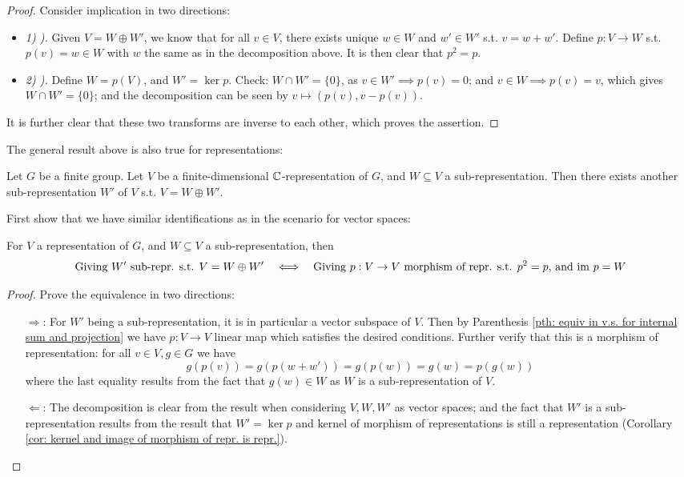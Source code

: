 \documentclass{article}
\begin{document}
\begin{proof}
    Consider implication in two directions:
    \begin{itemize}
        \item \emph{1) ).} Given $V = W \oplus W'$, we know that for all $v \in V$, there exists unique $w \in W$ and $w' \in W'$ s.t. $v = w + w'$. Define $p: V \to W$ s.t. $p(v) = w \in W$ with $w$ the same as in the decomposition above. It is then clear that $p^2 = p$.
        \item \emph{2) ).} Define $W = p(V)$, and $W' = \ker p$. Check: $W \cap W' = \{0\}$, as $v \in W' \implies p(v) = 0$; and $v \in W \implies p(v) = v$, which gives $W \cap W' = \{0\}$; and the decomposition can be seen by $v \mapsto (p(v), v - p(v))$.
    \end{itemize}
    It is further clear that these two transforms are inverse to each other, which proves the assertion.
\end{proof}

\textstart
The general result above is also true for representations:
\begin{theorem}\label{thm: decomposition of repr.}
    Let $G$ be a finite group. Let $V$ be a finite-dimensional $\mathbb{C}$-representation of $G$, and $W \subseteq V$ a sub-representation. Then there exists another sub-representation $W'$ of $V$ s.t. $V = W \oplus W'$.
\end{theorem}

First show that we have similar identifications as in the scenario for vector spaces: 
\begin{proposition}
    For $V$ a representation of $G$, and $W \subseteq V$ a sub-representation, then
    \[
        \text{Giving $W'$ sub-repr. s.t. $V = W \oplus W'$} \quad \Longleftrightarrow \quad \text{Giving $p: V \to V$ morphism of repr. s.t. $p^2 = p$, and $\mathrm{im}\  p = W$}
    \]
\end{proposition}
\begin{proof}
    Prove the equivalence in two directions:
    \begin{itemize}
        \item[$\Rightarrow$:] For $W'$ being a sub-representation, it is in particular a vector subspace of $V$. Then by Parenthesis \ref{pth: equiv in v.s. for internal sum and projection} we have $p: V \to V$ linear map which satisfies the desired conditions. Further verify that this is a morphism of representation: for all $v \in V, g \in G$ we have
        \[
            g(p(v)) = g(p(w + w')) = g(p(w)) = g(w) = p(g(w))
            \]
            where the last equality results from the fact that $g(w) \in W$ as $W$ is a sub-representation of $V$. 
        \item[$\Leftarrow$:] The decomposition is clear from the result when considering $V, W, W'$ as vector spaces; and the fact that $W'$ is a sub-representation results from the result that $W' = \ker p$ and kernel of morphism of representations is still a representation (Corollary \ref{cor: kernel and image of morphism of repr. is repr.}).
    \end{itemize}
\end{proof}
\end{document}
